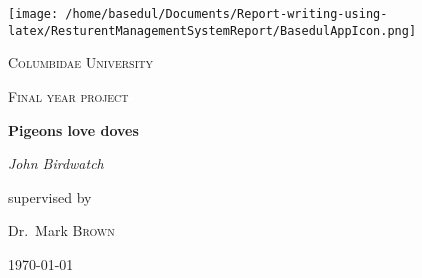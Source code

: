 \begin{titlepage}
\begin{center}
	\centering
	\texttt{[image: /home/basedul/Documents/Report-writing-using-latex/ResturentManagementSystemReport/BasedulAppIcon.png]}\par\vspace{1cm}
	{\scshape\LARGE Columbidae University \par}
	\vspace{1cm}
	{\scshape\Large Final year project\par}
	\vspace{1.5cm}
	{\huge\bfseries Pigeons love doves\par}
	\vspace{2cm}
	{\Large\itshape John Birdwatch\par}
	\vfill
	supervised by\par
	Dr.~Mark \textsc{Brown}

	\vfill

	{\large \today\par}
\end{center}
\end{titlepage}